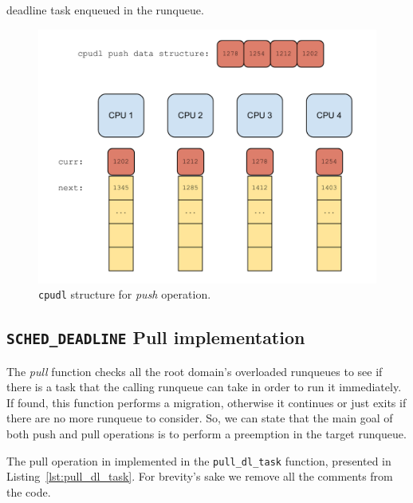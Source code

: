 deadline task enqueued in the runqueue.

\begin{figure}[htbp]
    \includegraphics[width=\columnwidth]{images/Push_cpudl}
    \caption{\texttt{cpudl} structure for \emph{push} operation.}
    \label{fig:cpudl_push}
\end{figure}

\subsection{\texttt{SCHED\_DEADLINE} Pull implementation\label{sec:pull_dl_impl}}

The \emph{pull} function checks all the root domain's overloaded
runqueues to see if there is a task that the calling runqueue can take
in order to run it immediately.  If found, this function performs a
migration, otherwise it continues or just exits if there are no more
runqueue to consider. So, we can state that the main goal of both push
and pull operations is to perform a preemption in the target runqueue.

The pull operation in implemented in the \texttt{pull\_dl\_task}
function, presented in Listing~\ref{lst:pull_dl_task}. For brevity's
sake we remove all the comments from the code.

